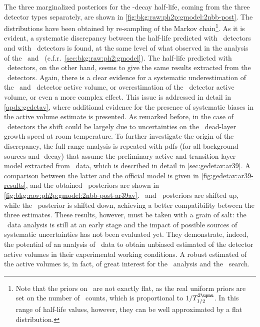 \blocktitle{\thalftwo}
The three marginalized posteriors for the \nnbb-decay half-life, coming from the three
detector types separately, are shown in \cref{fig:bkg:raw:ph2p:gmodel:2nbb-post}. The
distributions have been obtained by re-sampling of the Markov chain\footnote{%
  Note that the priors on \thalftwo\ are not exactly flat, as the real uniform priors are
  set on the number of \nnbb\ counts, which is proportional to $1/\thalftwoM$. In this
  range of half-life values, however, they can be well approximated by a flat
  distribution.
}. As it is evident, a systematic discrepancy between the half-life predicted with \bege\
detectors and with \scoax\ detectors is found, at the same level of what observed in the
analysis of the \enrBEGeII\ and \enrCoaxII\ (c.f.r.~\cref{sec:bkg:raw:ph2:gmodel}). The
half-life predicted with \icoax\ detectors, on the other hand, seems to give the same
results extracted from the \scoax\ detectors. Again, there is a clear evidence for a
systematic underestimation of the \scoax\ and \icoax\ detector active volume, or
overestimation of the \bege\ detector active volume, or even a more complex effect. This
issue is addressed in detail in \cref{apdx:gedetav}, where additional evidence for the
presence of systematic biases in the active volume estimate is presented. As remarked
before, in the case of \bege\ detectors the shift could be largely due to uncertainties on
the \nplus\ dead-layer growth speed at room temperature.
\newpar
To further investigate the origin of the discrepancy, the full-range analysis is repeated
with pdfs (for all background sources and \nnbb-decay) that assume the preliminary active
and transition layer model extracted from \Arl\ data, which is described in detail in
\cref{sec:gedetav:ar39}. A comparison between the latter and the official model is given
in \cref{fig:gedetav:ar39-results}, and the obtained \thalftwo\ posteriors are shown in
\cref{fig:bkg:raw:ph2p:gmodel:2nbb-post-ar39av}. \icoax\ and \scoax\ posteriors are
shifted up, while the \bege\ posterior is shifted down, achieving a better compatibility
between the three estimates. These results, however, must be taken with a grain of salt:
the \Arl\ data analysis is still at an early stage and the impact of possible sources of
systematic uncertainties has not been evaluated yet. They demonstrate, indeed, the
potential of an analysis of \Arl\ data to obtain unbiased estimated of the detector active
volumes in their experimental working conditions. A robust estimated of the active volumes
is, in fact, of great interest for the \nnbb\ analysis and the \onbb\ search.

